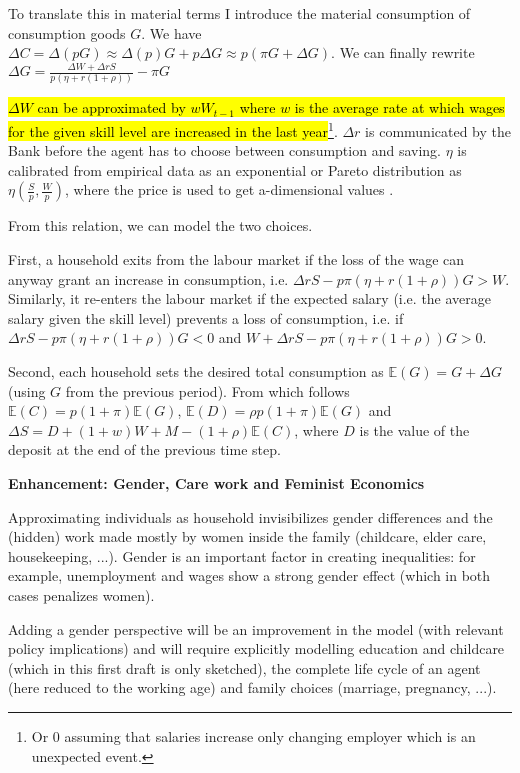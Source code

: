 \documentclass[a4paper, headings=standardclasses]{scrartcl}
\newenvironment{enh}[1][]{\begin{framed}\noindent\textbf{Enhancement: #1}\par}{\end{framed}}
\begin{document}
To translate this in material terms I introduce the material consumption of consumption goods $G$. We have $\Delta C = \Delta (p G) \approx \Delta(p) G + p \Delta G \approx p (\pi G + \Delta G)$. We can finally rewrite $\Delta G = \frac{\Delta W + \Delta r S}{p (\eta + r (1+\rho))} - \pi G$

\hl{$\Delta W$ can be approximated by $w W_{t-1}$ where $w$ is the average rate at which wages for the given skill level are increased in the last year}\footnote{Or 0 assuming that salaries increase only changing employer which is an unexpected event.}. $\Delta r$ is communicated by the Bank before the agent has to choose between consumption and saving. $\eta$ is calibrated from empirical data as an exponential or Pareto distribution as $\eta(\frac{S}{p},\frac{W}{p})$, where the price is used to get a-dimensional values \parencite{fisher2020,carroll2017}.

From this relation, we can model the two choices.

First, a household exits from the labour market if the loss of the wage can anyway grant an increase in consumption, i.e. $\Delta r S - p \pi (\eta + r (1+\rho)) G > W$. Similarly, it re-enters the labour market if the expected salary (i.e. the average salary given the skill level) prevents a loss of consumption, i.e. if $\Delta r S - p \pi (\eta + r (1+\rho)) G < 0$ and $W + \Delta r S - p \pi (\eta + r (1+\rho)) G > 0$.

Second, each household sets the desired total consumption as $\mathbb{E}(G) = G + \Delta G$ (using $G$ from the previous period). From which follows $\mathbb{E}(C) = p (1+\pi) \mathbb{E}(G)$, $\mathbb{E}(D) = \rho p (1+\pi) \mathbb{E}(G)$ and $\Delta S = D + (1+w) W + M - (1+\rho) \mathbb{E}(C)$, where $D$ is the value of the deposit at the end of the previous time step.

\begin{enh}[Gender, Care work and Feminist Economics]
	Approximating individuals as household invisibilizes gender differences and the (hidden) work made mostly by women inside the family (childcare, elder care, housekeeping, ...).
	Gender is an important factor in creating inequalities: for example, unemployment and wages show a strong gender effect (which in both cases penalizes women).

	Adding a gender perspective will be an improvement in the model (with relevant policy implications) and will require explicitly modelling education and childcare (which in this first draft is only sketched), the complete life cycle of an agent (here reduced to the working age) and family choices (marriage, pregnancy, ...).
\end{enh}
\end{document}
